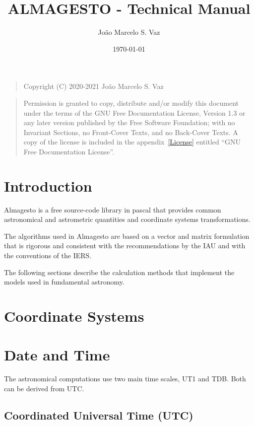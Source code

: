 \documentclass{report}
\title{ALMAGESTO - Technical Manual}
\author{João Marcelo S. Vaz}
\date{\today}
\begin{document}
	
\maketitle
{}
\begin{quote}    
Copyright (C) 2020-2021 João Marcelo S. Vaz
\end{quote}
\begin{quote} 
Permission is granted to copy, distribute and/or modify this document under the terms of the GNU Free Documentation License, Version 1.3 or any later version published by the Free Software Foundation; with no Invariant Sections, no Front-Cover Texts, and no Back-Cover Texts. A copy of the license is included in the appendix~\ref{License} entitled ``GNU Free Documentation License''.
\end{quote}
	
\tableofcontents
\printglossary[type=\acronymtype,title=List of Abbreviations]

	
\clearpage
{}
\chapter{Introduction}\label{Introduction}

Almagesto is a free source-code library in pascal that provides common astronomical and astrometric quantities and coordinate systems transformations.

The algorithms used in Almagesto are based on a vector and matrix formulation that is rigorous and consistent with the recommendations by the \gls{IAU} and with the conventions of the \gls{IERS}.

The following sections describe the calculation methods that implement the models used in fundamental astronomy.

\chapter{Coordinate Systems}\label{CoordinateSystems}

\chapter{Date and Time}\label{TimeScales}

The astronomical computations use two main time scales, \gls{UT1} and \gls{TDB}. Both can be derived from \gls{UTC}.

\section{Coordinated Universal Time (UTC)}\label{UTC}
\end{document}
